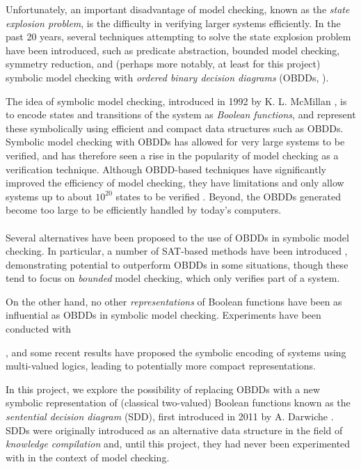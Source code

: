 \documentclass[11pt]{report}
\begin{document}
Unfortunately, an important disadvantage of model checking, known as the \textit{state explosion problem}, is the difficulty in verifying larger systems efficiently. In the past 20 years, several techniques attempting to solve the state explosion problem have been introduced, such as predicate abstraction, bounded model checking, symmetry reduction, and (perhaps more notably, at least for this project) symbolic model checking with \textit{ordered binary decision diagrams} (OBDDs, \cite{bryant}).

The idea of symbolic model checking, introduced in 1992 by K. L. McMillan \cite{symbolic}, is to encode states and transitions of the system as \textit{Boolean functions}, and represent these symbolically using efficient and compact data structures such as OBDDs. Symbolic model checking with OBDDs has allowed for very large systems to be verified, and has therefore seen a rise in the popularity of model checking as a verification technique.
Although OBDD-based techniques have significantly improved the efficiency of model checking, they have limitations and only allow systems up to about $10^{20}$ states to be verified \cite{1020_beyond}. Beyond, the OBDDs generated become too large to be efficiently handled by today's computers. 
\\\\
Several alternatives have been proposed to the use of OBDDs in symbolic model checking. In particular, a number of SAT-based methods have been introduced \cite{sat_based_smc3, sat_based_smc, sat_based_smc2}, demonstrating potential to outperform OBDDs in some situations, though these tend to focus on \textit{bounded} model checking, which only verifies part of a system. 

On the other hand, no other \textit{representations} of Boolean functions have been as influential as OBDDs in symbolic model checking. Experiments have been conducted with 

, and some recent results \cite{evmdd, multivalued_data_structures} have proposed the symbolic encoding of systems using multi-valued logics, leading to potentially more compact representations.
 
In this project, we explore the possibility of replacing OBDDs with a new symbolic representation of (classical two-valued) Boolean functions known as the \textit{sentential decision diagram} (SDD), first introduced in 2011 by A. Darwiche \cite{sdd_1}. SDDs were originally introduced as an alternative data structure in the field of \textit{knowledge compilation} and, until this project, they had never been experimented with in the context of model checking. 
\end{document}
